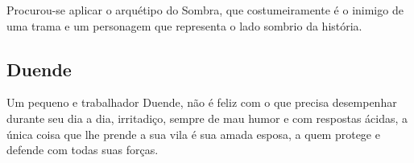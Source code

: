Procurou-se aplicar o arquétipo do Sombra, que costumeiramente é o inimigo de uma trama e um personagem que representa o lado sombrio da história.






\subsection{Duende}
Um pequeno e trabalhador Duende, não é feliz com o que precisa desempenhar durante seu dia a dia, irritadiço, sempre de mau humor e com respostas ácidas, a única coisa que lhe prende a sua vila é sua amada esposa, a quem protege e defende com todas suas forças.










